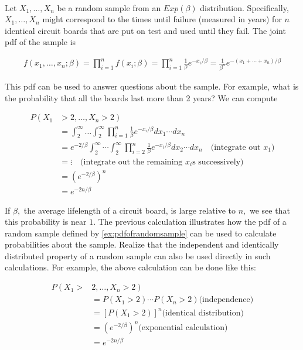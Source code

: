 \documentclass[ 11pt,%
				a4paper,%
				twoside,%
				headinclude,%
				footinclude = true,%
				cleardoublepage = empty,%
				reqno]{scrbook}
\begin{document}
\begin{example}~\label{ex:pdfofrandomsample}

Let $X_{1}, \ldots, X_{n}$ be a random sample from an $Exp(\beta)$ distribution. Specifically, $X_{1}, \ldots, X_{n}$ might correspond to the times until failure (measured in years) for $n$ identical circuit boards that are put on test and used until they fail. The joint pdf of the sample is

\begin{align*}
  f\left(x_{1}, \ldots, x_{n} ; \beta\right)=\prod_{i=1}^{n} f\left(x_{i} ; \beta\right)=\prod_{i=1}^{n} \frac{1}{\beta} e^{-x_{i} / \beta}=\frac{1}{\beta^{n}} e^{-\left(x_{1}+\cdots+x_{n}\right) / \beta}
\end{align*}

This pdf can be used to answer questions about the sample. For example, what is the probability that all the boards last more than 2 years? We can compute


\begin{align*}
P\left(X_{1}\right.&\left.>2, \ldots, X_{n}>2\right) \\
&=\int_{2}^{\infty} \ldots \int_{2}^{\infty} \prod_{i=1}^{n} \frac{1}{\beta} e^{-x_{i} / \beta} d x_{1} \cdots d x_{n} \\
&=e^{-2 / \beta} \int_{2}^{\infty} \cdots \int_{2}^{\infty} \prod_{i=2}^{n} \frac{1}{\beta} e^{-x_{i} / \beta} d x_{2} \cdots d x_{n} \quad \text{(integrate out $x_1$)}\\
&=\vdots \quad \text{(integrate out the remaining $x_i$s successively)}\\
&=\left(e^{-2 / \beta}\right)^{n} \\
&=e^{-2 n / \beta}
\end{align*}




If $\beta,$ the average lifelength of a circuit board, is large relative to $n,$ we see that this probability is near $1$. The previous calculation illustrates how the pdf of a random sample defined by \cref{ex:pdfofrandomsample} can be used to calculate probabilities about the sample. Realize that the independent and identically distributed property of a random sample can also be used directly in such calculations. For example, the above calculation can be done like this: 

\begin{align*}
P\left(X_{1}>\right.&\left.2, \ldots, X_{n}>2\right) \\
&=P\left(X_{1}>2\right) \cdots P\left(X_{n}>2\right) \text{(independence)}\\
&=\left[P\left(X_{1}>2\right)\right]^{n} \text{(identical distribution)}\\
&=\left(e^{-2 / \beta}\right)^{n} \text{(exponential calculation)}\\
&=e^{-2 n / \beta}
\end{align*}

\end{example}
\end{document}
